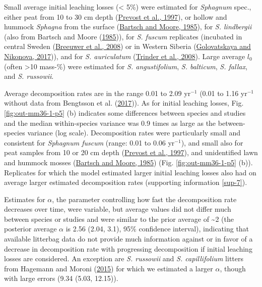 \documentclass[
  12pt,
]{article}
\begin{document}
Small average initial leaching losses (\textless{} 5\%) were estimated for \emph{Sphagnum} spec., either peat from 10 to 30 cm depth (\protect\hyperlink{ref-Prevost.1997}{Prevost et al., 1997}), or hollow and hummock \emph{Sphagna} from the surface (\protect\hyperlink{ref-Bartsch.1985}{Bartsch and Moore, 1985}), for \emph{S. lindbergii} (also from Bartsch and Moore (\protect\hyperlink{ref-Bartsch.1985}{1985})), for \emph{S. fuscum} replicates (incubated in central Sweden (\protect\hyperlink{ref-Breeuwer.2008}{Breeuwer et al., 2008}) or in Western Siberia (\protect\hyperlink{ref-Golovatskaya.2017}{Golovatskaya and Nikonova, 2017})), and for \emph{S. auriculatum} (\protect\hyperlink{ref-Trinder.2008}{Trinder et al., 2008}). Large average \(l_0\) (often \textgreater10 mass-\%) were estimated for \emph{S. angustifolium}, \emph{S. balticum}, \emph{S. fallax}, and \emph{S. russowii}.

Average decomposition rates are in the range 0.01 to 2.09 yr\(^{-1}\) (0.01 to 1.16 yr\(^{-1}\) without data from Bengtsson et al. (\protect\hyperlink{ref-Bengtsson.2017}{2017})). As for initial leaching losses, Fig. \ref{fig:out-mm36-1-p5} (b) indicates some differences between species and studies and the median within-species variance was 0.9 times as large as the between-species variance (log scale). Decomposition rates were particularly small and consistent for \emph{Sphagnum fuscum} (range: 0.01 to 0.06 yr\(^{-1}\)), and small also for peat samples from 10 or 20 cm depth (\protect\hyperlink{ref-Prevost.1997}{Prevost et al., 1997}), and unidentified lawn and hummock mosses (\protect\hyperlink{ref-Bartsch.1985}{Bartsch and Moore, 1985}) (Fig. \ref{fig:out-mm36-1-p5} (b)). Replicates for which the model estimated larger initial leaching losses also had on average larger estimated decomposition rates (supporting information \ref{sup-7}).

Estimates for \(\alpha\), the parameter controlling how fast the decomposition rate decreases over time, were variable, but average values did not differ much between species or studies and were similar to the prior average of \textasciitilde2 (the posterior average \(\alpha\) is 2.56 (2.04, 3.1), 95\% confidence interval), indicating that available litterbag data do not provide much information against or in favor of a decrease in decomposition rate with progressing decomposition if initial leaching losses are considered. An exception are \emph{S. russowii} and \emph{S. capillifolium} litters from Hagemann and Moroni (\protect\hyperlink{ref-Hagemann.2015}{2015}) for which we estimated a larger \(\alpha\), though with large errors (9.34 (5.03, 12.15)).
\end{document}
